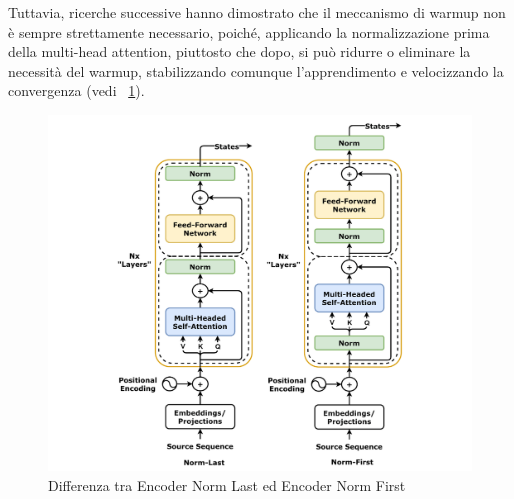 Tuttavia, ricerche successive hanno dimostrato che il meccanismo di warmup non è sempre strettamente necessario, poiché, applicando la normalizzazione prima della multi-head attention, piuttosto che dopo, si può ridurre o eliminare la necessità del warmup, stabilizzando comunque l'apprendimento e velocizzando la convergenza \cite{xiong2020layernormalizationtransformerarchitecture} (vedi \figurename{~\ref{fig:encoder}}).
\begin{figure}[!t]
    \centering
    \begin{minipage}{0.48\textwidth}
        \centering
		\hspace*{-2cm}
        \includegraphics[width=1.5\linewidth]{Images/cap1/Transformer_encoder,_with_norm-first_and_norm-last.png}
        \caption{Differenza tra Encoder Norm Last ed Encoder Norm First}
        \label{fig:encoder}
    \end{minipage}
    \hfill
    \begin{minipage}{0.48\textwidth}
        \centering
		\hspace*{-0.7cm}

\end{minipage}
\end{figure}
